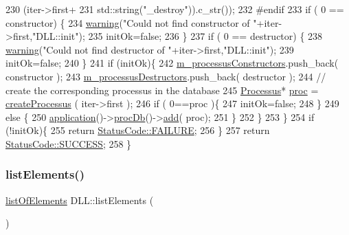 \begin{DoxyCode}
230                                            (iter->first+
231                                            std::string(\textcolor{stringliteral}{"\_destroy"})).c\_str());
232 \textcolor{preprocessor}{#endif
}
233     \textcolor{keywordflow}{if} ( 0 == constructor) \{
234       \hyperlink{classDLL_a4bbc341bad623eedb5c228c91ce2e858}{warning}(\textcolor{stringliteral}{"Could not find constructor of "}+iter->first,\textcolor{stringliteral}{"DLL::init"});
235       initOk=\textcolor{keyword}{false};
236     \}
237     \textcolor{keywordflow}{if} ( 0 == destructor) \{
238       \hyperlink{classDLL_a4bbc341bad623eedb5c228c91ce2e858}{warning}(\textcolor{stringliteral}{"Could not find destructor of "}+iter->first,\textcolor{stringliteral}{"DLL::init"});
239       initOk=\textcolor{keyword}{false};
240     \}
241     \textcolor{keywordflow}{if} (initOk)\{
242       \hyperlink{classDLL_af9b49d23b767b742e38a7286de8e7c4d}{m\_processusConstructors}.push\_back( constructor );
243       \hyperlink{classDLL_a5a00cc3723ff34be55c621505f15fc08}{m\_processusDestructors}.push\_back( destructor );
244       \textcolor{comment}{// create the corresponding processus in the database}
245       \hyperlink{classProcessus}{Processus}* \hyperlink{namespaceproc}{proc} = \hyperlink{classDLL_a9136bcd5e5ca7894bd337241803735c3}{createProcessus} ( iter->first );
246       \textcolor{keywordflow}{if} ( 0==proc )\{
247         initOk=\textcolor{keyword}{false};
248       \}
249       \textcolor{keywordflow}{else} \{
250         \hyperlink{Tools_8h_a27885a3c35afe79029fb830f32f66458}{application}()->\hyperlink{classApplication_aa5c28af1a7e1c41dada2db2a4d03c57d}{procDb}()->\hyperlink{classProcDataBase_a0aafeb65a41b92a6d1fdd67f363ef826}{add}( proc);
251       \}
252     \}
253   \}
254   \textcolor{keywordflow}{if} (!initOk)\{
255     \textcolor{keywordflow}{return} \hyperlink{classStatusCode_a6f565cbeadc76d14c72f047e5e85eb4ba3da73d4c469762eb9d3c960368252b26}{StatusCode::FAILURE};
256   \}
257   \textcolor{keywordflow}{return} \hyperlink{classStatusCode_a6f565cbeadc76d14c72f047e5e85eb4badd0da38d3ba0d922efd1f4619bc37ad8}{StatusCode::SUCCESS};
258 \}
\end{DoxyCode}
\mbox{\label{classDLL_adc96628c3ffd637827615fb5a3c71119}} 
\subsubsection{\texorpdfstring{list\+Elements()}{listElements()}}
{\footnotesize\ttfamily \hyperlink{classDLL_a36792635c3cd36adbaaef2ff7152046e}{list\+Of\+Elements} D\+L\+L\+::list\+Elements (\begin{DoxyParamCaption}{ }\end{DoxyParamCaption})\hspace{0.3cm}{\ttfamily [inline]}}

